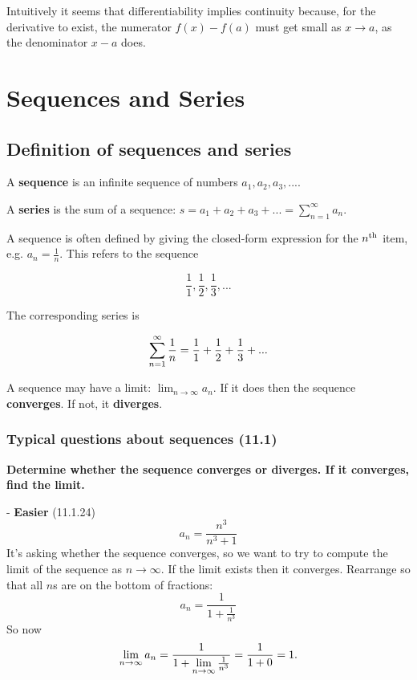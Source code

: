\begin{remark*}
  Intuitively it seems that differentiability implies continuity because, for the derivative to
  exist, the numerator $f(x) - f(a)$ must get small as $x\to a$, as the denominator $x - a$ does.
\end{remark*}




\section{Sequences and Series}

\subsection{Definition of sequences and series}

A \textbf{sequence} is an infinite sequence of numbers $a_1, a_2, a_3, ...$.

A \textbf{series} is the sum of a sequence: $s = a_1 + a_2 + a_3 + ... = \sum_{n=1}^\infty a_n$.

A sequence is often defined by giving the closed-form expression for the $n^{\text{th}}$ item, e.g. $a_n = \frac{1}{n}$. This refers to the sequence

$$\frac{1}{1}, \frac{1}{2}, \frac{1}{3}, ...$$

The corresponding series is

$$
\sum_{n=1}^{\infty} \frac{1}{n} = \frac{1}{1} + \frac{1}{2} + \frac{1}{3} + ...
$$

A sequence may have a limit: $\lim_{n \rightarrow \infty} a_n$. If it does then the sequence \textbf{converges}. If not, it \textbf{diverges}.

\subsubsection{Typical questions about sequences (11.1)}


\textbf{Determine whether the sequence converges or diverges. If it converges, find the limit.}

- \textbf{Easier} (11.1.24)
  $$
  a_n = \frac{n^3}{n^3 + 1}
  $$
  It's asking whether the sequence converges, so we want to try to compute the limit of the sequence as $n \rightarrow \infty$. If the limit exists then it converges. Rearrange so that all $n$s are on the bottom of fractions:
  $$
  a_n = \frac{1}{1 + \frac{1}{n^3}}
  $$
  So now
  $$
  \lim\limits_{n \to \infty} a_n = \frac{1}{1 + \lim\limits_{n \to \infty}\frac{1}{n^3}} = \frac{1}{1 + 0} = 1.
  $$

